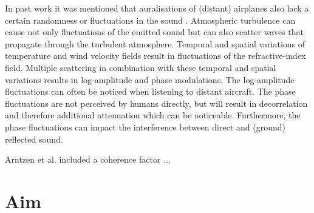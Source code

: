 In past work it was mentioned that auralisations of (distant) airplanes also
lack a certain randomness or fluctuations in the sound \cite{Arntzen2014a}.
Atmospheric turbulence can cause not only fluctuations of the emitted sound but
can also scatter waves that propagate through the turbulent atmosphere. Temporal
and spatial variations of temperature and wind velocity fields result in
fluctuations of the refractive-index field. Multiple scattering in combination
with these temporal and spatial variations results in log-amplitude and phase
modulations. The log-amplitude fluctuations can often be noticed when listening
to distant aircraft. The phase fluctuations are not perceived by humans
directly, but will result in decorrelation and therefore additional attenuation
which can be noticeable. Furthermore, the phase fluctuations can impact the
interference between direct and (ground) reflected sound.


Arntzen et al. included a coherence factor ...

%
%
%
%
%
%
%
%


\newpage
\section{Aim}

